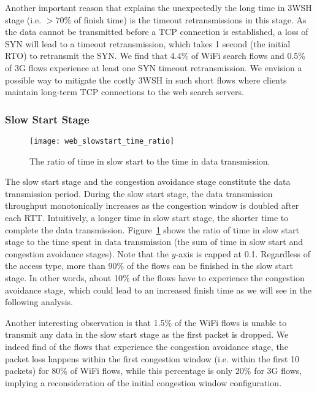Another important reason that explains the unexpectedly the long time in 3WSH stage (i.e. $>70\%$ of finish time) is the timeout retransmissions in this stage. As the data cannot be transmitted before a TCP connection is established, a loss of SYN will lead to a timeout retransmission, which takes 1 second (\ie the initial RTO) to retransmit the SYN.  We find that 4.4\% of WiFi search flows and 0.5\% of 3G flows experience at least one SYN timeout retransmission. We envision a possible way to mitigate the costly 3WSH in such short flows where clients maintain long-term TCP connections to the web search servers.

\subsubsection{Slow Start Stage}

\begin{figure}[th]
\centering
\texttt{[image: web\_slowstart\_time\_ratio]}
\caption{The ratio of time in slow start to the time in data transmission.}
\label{fig:web_ss_time_ratio}
\end{figure}

The slow start stage and the congestion avoidance stage constitute the data transmission period. During the slow start stage, the data transmission throughput monotonically increases as the congestion window is doubled after each RTT. Intuitively, a longer time in slow start stage, the shorter time to complete the data transmission. Figure~\ref{fig:web_ss_time_ratio} shows the ratio of time in slow start stage to the time spent in data transmission (\ie the sum of time in slow start and congestion avoidance stages). Note that the $y$-axis is capped at 0.1. Regardless of the access type, more than 90\% of the flows can be finished in the slow start stage. In other words, about 10\% of the flows have to experience the congestion avoidance stage, which could lead to an increased finish time as we will see in the following analysis.

Another interesting observation is that 1.5\% of the WiFi flows is unable to transmit any data in the slow start stage as the first packet is dropped. We indeed find of the flows that experience the congestion avoidance stage, the packet loss happens within the first congestion window (i.e. within the first 10 packets) for 80\% of WiFi flows, while this percentage is only 20\% for 3G flows, implying a reconsideration of the initial congestion window configuration.

